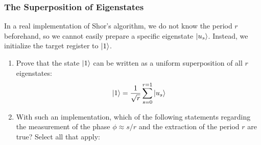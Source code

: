 \subsubsection{The Superposition of Eigenstates}
In a real implementation of Shor's algorithm, we do not know the period $r$ beforehand, so we cannot easily prepare a specific eigenstate $\ket{u_s}$. Instead, we initialize the target register to $\ket{1}$.
\begin{enumerate}
    \item Prove that the state $\ket{1}$ can be written as a uniform superposition of all $r$ eigenstates:
    \begin{equation}
        \ket{1} = \frac{1}{\sqrt{r}} \sum_{s=0}^{r=1}\ket{u_s}
    \end{equation}

    \item With such an implementation, which of the following statements regarding the measurement of the phase $\phi \approx s/r$ and the extraction of the period $r$ are true? Select all that apply: \\
\end{enumerate}
\noindent{} \newline \\\\
